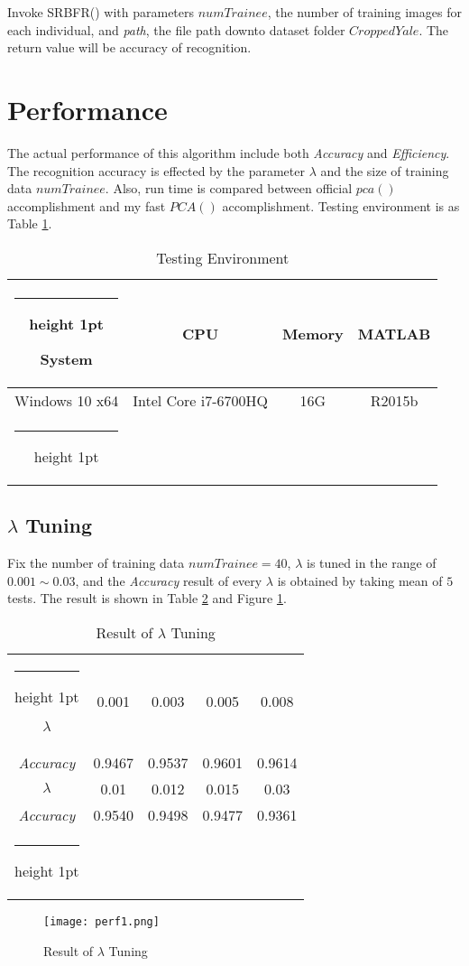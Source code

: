 \documentclass[10pt,journal]{IEEEtran}
\makeatletter
\newcommand{\thickhline}{%
			\noalign {\ifnum 0=`}\fi \hrule height 1pt
			\futurelet \reserved@a \@xhline
		}
\renewcommand{\[}{\begin{equation*} \begin{aligned}} %
\renewcommand{\]}{\end{aligned} \end{equation*}}
\makeatother
\begin{document}
Invoke SRBFR() with parameters $numTrainee$, the number of training images for each individual, and \textit{path}, the file path downto dataset folder $CroppedYale$. The return value will be accuracy of recognition.

\section{\textbf{\large Performance}}
The actual performance of this algorithm include both \textit{Accuracy} and \textit{Efficiency}. The recognition accuracy is effected by the parameter $\lambda$ and the size of training data $numTrainee$. Also, run time is compared between official $pca()$ accomplishment and my fast $PCA()$ accomplishment. Testing environment is as Table \ref{tab:env}.
\vspace{8pt}
\begin{table}[H]
	\centering
	\begin{tabular}{cccc}
		\thickhline
		\textbf{System} & \textbf{CPU} & \textbf{Memory} & \textbf{MATLAB} \\ \hline
		Windows 10 x64 & Intel Core i7-6700HQ & 16G & R2015b \\ \thickhline
	\end{tabular}
	\vspace{6pt}
	\caption{Testing Environment} \label{tab:env}
\end{table}

\subsection{\large $\lambda$ Tuning}
Fix the number of training data $numTrainee = 40$, $\lambda$ is tuned in the range of $0.001 \sim 0.03$, and the \textit{Accuracy} result of every $\lambda$ is obtained by taking mean of $5$ tests. The result is shown in Table \ref{tab:perf1} and Figure \ref{fig:perf1}.
\vspace{8pt}
\begin{table}[H]
	\centering
	\begin{tabular}{c||cccc}
		\thickhline
		$\lambda$ & 0.001 & 0.003 & 0.005 & 0.008 \\ 
		\textit{Accuracy} & 0.9467 & 0.9537 & 0.9601 & 0.9614  \\ \hline
		$\lambda$ & 0.01 & 0.012 & 0.015 & 0.03 \\
		\textit{Accuracy} & 0.9540 & 0.9498 & 0.9477 & 0.9361 \\ \thickhline
	\end{tabular}
	\vspace{6pt}
	\caption{Result of $\lambda$ Tuning} \label{tab:perf1}
\end{table}
\begin{figure}[H]
	\centering
	\texttt{[image: perf1.png]}
	\caption{Result of $\lambda$ Tuning} \label{fig:perf1}
\end{figure}
\end{document}
